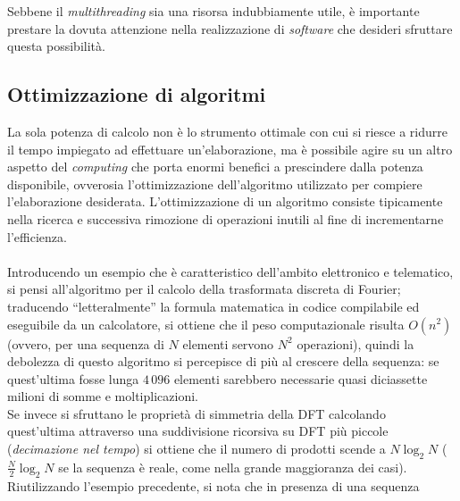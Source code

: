 Sebbene il \emph{multithreading} sia una risorsa indubbiamente utile, è
importante prestare la dovuta attenzione nella realizzazione di \emph{software}
che desideri sfruttare questa possibilità.

\subsection{Ottimizzazione di algoritmi}

La sola potenza di calcolo %
non è lo strumento ottimale con cui si riesce a
ridurre il tempo impiegato ad effettuare un'elaborazione, ma è possibile agire
su un altro aspetto del \emph{computing} che porta enormi benefici a prescindere
dalla potenza disponibile, ovverosia l'ottimizzazione dell'algoritmo utilizzato
per compiere l'elaborazione desiderata.
L'ottimizzazione di un algoritmo consiste tipicamente nella ricerca e 
successiva rimozione di operazioni inutili al fine di incrementarne 
l'efficienza.
\\ \\ 
Introducendo un esempio che è caratteristico dell'ambito elettronico e
telematico, si pensi all'algoritmo per il calcolo della trasformata discreta
di Fourier; traducendo ``letteralmente'' la formula matematica in codice
compilabile ed eseguibile da un calcolatore, si ottiene che il peso
computazionale risulta $O(n^2)$ (ovvero, per una sequenza di $N$ 
elementi servono $N^2$ operazioni), quindi la debolezza di questo algoritmo 
si percepisce di più al crescere della sequenza: %
 se quest'ultima fosse lunga $4\,096$ elementi sarebbero necessarie quasi 
 diciassette milioni di somme e moltiplicazioni. \\
Se invece si sfruttano le proprietà di simmetria della DFT calcolando 
quest'ultima attraverso una suddivisione ricorsiva su DFT più piccole 
(\emph{decimazione nel tempo}) si ottiene che il numero di prodotti scende a
$N\log_{2}N$ ($\frac{N}{2}\log_2N$ se la sequenza è 
reale, come nella grande maggioranza dei casi). %
\\ Riutilizzando l'esempio precedente, si nota che in presenza di una sequenza 
